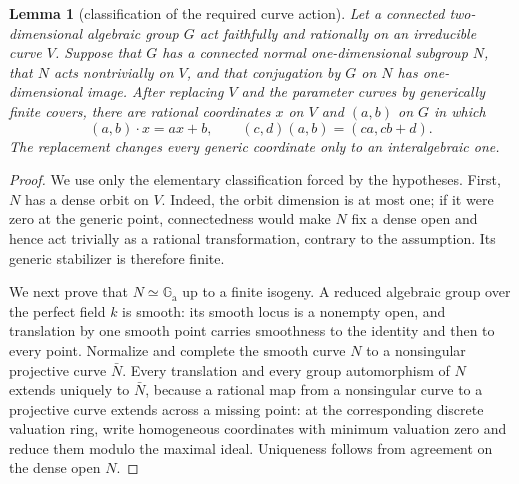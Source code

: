 \documentclass[11pt,oneside]{article}
\newtheorem{lemma}[theorem]{Lemma}
\theoremstyle{definition}
\theoremstyle{remark}
\newcommand{\Ga}{\mathbb G_{\mathrm a}}
\begin{document}
\begin{lemma}[classification of the required curve action]\label{lem:affine-action}
Let a connected two-dimensional algebraic group $G$ act faithfully and rationally on an
irreducible curve $V$.  Suppose that $G$ has a connected normal one-dimensional subgroup
$N$, that $N$ acts nontrivially on $V$, and that conjugation by $G$ on $N$ has
one-dimensional image.  After replacing $V$ and the parameter curves by generically
finite covers, there are rational coordinates $x$ on $V$ and $(a,b)$ on $G$ in which
\[
       (a,b)\cdot x=ax+b,\qquad
       (c,d)(a,b)=(ca,cb+d).                                  \tag{8.4a}
\]
The replacement changes every generic coordinate only to an interalgebraic one.
\end{lemma}
\begin{proof}
We use only the elementary classification forced by the hypotheses.  First, $N$ has a
dense orbit on $V$.  Indeed, the orbit dimension is at most one; if it were zero at the
generic point, connectedness would make $N$ fix a dense open and hence act trivially as
a rational transformation, contrary to the assumption.  Its generic stabilizer is
therefore finite.

We next prove that $N\simeq\Ga$ up to a finite isogeny.  A reduced algebraic group over
the perfect field $k$ is smooth: its smooth locus is a nonempty open, and translation by
one smooth point carries smoothness to the identity and then to every point.  Normalize
and complete the smooth curve $N$ to a nonsingular projective curve $\bar N$.  Every
translation and every group automorphism of $N$ extends uniquely to $\bar N$, because a
rational map from a nonsingular curve to a projective curve extends across a missing
point: at the corresponding discrete valuation ring, write homogeneous coordinates
with minimum valuation zero and reduce them modulo the maximal ideal.  Uniqueness follows
from agreement on the dense open $N$.


\end{proof}
\end{document}
